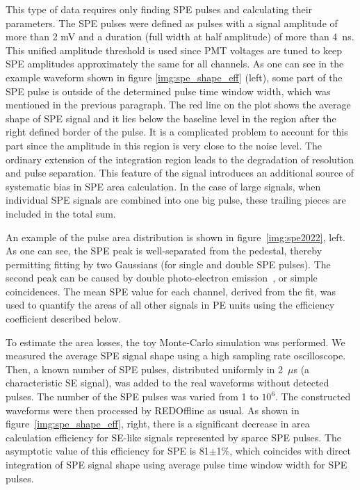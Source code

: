 \documentclass[a4paper,11pt]{article}
\begin{document}
This type of data requires only finding SPE pulses and calculating their parameters. 
The SPE pulses were defined as pulses with a signal amplitude of more than 2 mV and a duration (full width at half amplitude) of more than 4~ns. 
This unified amplitude threshold is used since PMT voltages are tuned to keep SPE amplitudes approximately the same for all channels. 
As one can see in the example waveform shown in figure \ref{img:spe_shape_eff} (left), some part of the SPE pulse is outside of the determined pulse time window width, which was mentioned in the previous paragraph. The red line on the plot shows the average shape of SPE signal and it lies below the baseline level in the region after the right defined border of the pulse.
It is a complicated problem to account for this part since the amplitude in this region is very close to the noise level.
The ordinary extension of the integration region leads to the degradation of resolution and pulse separation.
 This feature of the signal introduces an additional source of systematic bias in SPE area calculation. 
In the case of large signals, when individual SPE signals are combined into one big pulse, these trailing pieces are included in the total sum.

An example of the pulse area distribution is shown in figure~\ref{img:spe2022}, left.
As one can see, the SPE peak is well-separated from the pedestal, thereby permitting fitting by two Gaussians (for single and double SPE pulses). 
The second peak can be caused by double photo-electron emission~\cite{Faham_2015}, or simple coincidences.
The mean SPE value for each channel, derived from the fit, was used to quantify the areas of all other signals in PE units using the efficiency coefficient described below. 

To estimate the area losses, the toy Monte-Carlo simulation was performed. We measured the average SPE signal shape using a high sampling rate oscilloscope. 
Then, a known number of SPE pulses, distributed uniformly in 2~$\mu$s (a characteristic SE signal), was added to the real waveforms without detected pulses. 
The number of the SPE pulses was varied from 1 to $10^6$. 
The constructed waveforms were then processed by REDOffline as usual.
As shown in figure~\ref{img:spe_shape_eff}, right, there is a significant decrease in area calculation efficiency for SE-like signals represented by sparce SPE pulses. 
The asymptotic value of this efficiency for SPE is 81$\pm$1\%, which coincides with direct integration of SPE signal shape using average pulse time window width for SPE pulses. 
\end{document}

